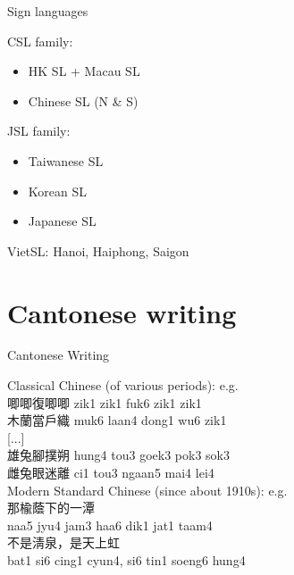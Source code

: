 \documentclass{beamer}
\begin{document}
\begin{frame}[fragile]{Sign languages}

CSL family:\\
\begin{itemize}
    \item HK SL + Macau SL\\
    \item Chinese SL (N \& S)\\
\end{itemize}

JSL family:\\
\begin{itemize}
    \item Taiwanese SL\\
    \item Korean SL\\
    \item Japanese SL\\
\end{itemize}

VietSL: Hanoi, Haiphong, Saigon\\

\end{frame}

\section{Cantonese writing}

\begin{frame}[fragile]{Cantonese Writing}

Classical Chinese (of various periods): e.g.\\ 
唧唧復唧唧 zik1 zik1 fuk6 zik1 zik1\\
木蘭當戶織 muk6 laan4 dong1 wu6 zik1\\
{[...]}\\
雄兔腳撲朔 hung4 tou3 goek3 pok3 sok3\\
雌兔眼迷離 ci1 tou3 ngaan5 mai4 lei4\\
\bigskip
Modern Standard Chinese (since about 1910s): e.g.\\
那楡蔭下的一潭\\
naa5 jyu4 jam3 haa6 dik1 jat1 taam4\\
不是淸泉，是天上虹\\
bat1 si6 cing1 cyun4, si6 tin1 soeng6 hung4\\

\end{frame}
\end{document}
